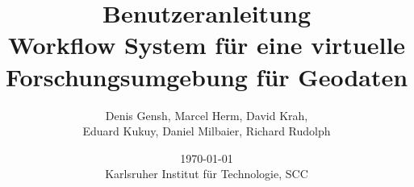 \documentclass[oneside]{scrbook}
\title{
    \vspace{-3.5cm}
    \Huge {\textbf{Benutzeranleitung}}\\
    \vspace{2cm}
    \Large{\textbf{Workflow System für eine virtuelle Forschungsumgebung für Geodaten}}\\
    \vspace{1cm}
}
\author{
    Denis Gensh, Marcel Herm, David Krah,\\
    Eduard Kukuy, Daniel Milbaier, Richard Rudolph\\
} %
\date{
    \today \\
    Karlsruher Institut für Technologie, SCC\\
}
\begin{document}
    
    
    
    \printglossaries
\end{document}
